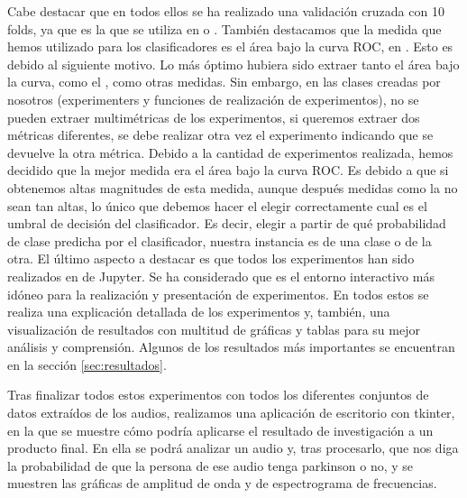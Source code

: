 Cabe destacar que en todos ellos se ha realizado una validación cruzada con 10 folds, ya que es la que se utiliza en \cite{Orz2016} o \cite{MxLtAccurate}. También destacamos que la medida que hemos utilizado para los clasificadores es el área bajo la curva ROC,  en . Esto es debido al siguiente motivo. Lo más óptimo hubiera sido extraer tanto el área bajo la curva, como el , como otras medidas. Sin embargo, en las clases creadas por nosotros (experimenters y funciones de realización de experimentos), no se pueden extraer multimétricas de los experimentos, si queremos extraer dos métricas diferentes, se debe realizar otra vez el experimento indicando que se devuelve la otra métrica. Debido a la cantidad de experimentos realizada, hemos decidido que la mejor medida era el área bajo la curva ROC. Es debido a que si obtenemos altas magnitudes de esta medida, aunque después medidas como la  no sean tan altas, lo único que debemos hacer el elegir correctamente cual es el umbral de decisión del clasificador. Es decir, elegir a partir de qué probabilidad de clase predicha por el clasificador, nuestra instancia es de una clase o de la otra. El último aspecto a destacar es que todos los experimentos han sido realizados en  de Jupyter. Se ha considerado que es el entorno interactivo más idóneo para la realización y presentación de experimentos. En todos estos  se realiza una explicación detallada de los experimentos y, también, una visualización de resultados con multitud de gráficas y tablas para su mejor análisis y comprensión. Algunos de los resultados más importantes se encuentran en la sección \ref{sec:resultados}.

Tras finalizar todos estos experimentos con todos los diferentes conjuntos de datos extraídos de los audios, realizamos una aplicación de escritorio con tkinter, en la que se muestre cómo podría aplicarse el resultado de investigación a un producto final. En ella se podrá analizar un audio y, tras procesarlo, que nos diga la probabilidad de que la persona de ese audio tenga parkinson o no, y se muestren las gráficas de amplitud de onda y de espectrograma de frecuencias.



